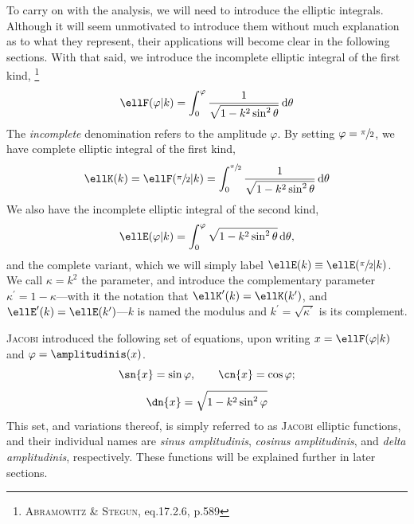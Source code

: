 To carry on with the analysis, we will need to introduce the elliptic integrals.
Although it will seem unmotivated to introduce them without much explanation as to what they represent, their applications will become clear in the following sections.
With that said, we introduce the incomplete elliptic integral of the first kind,%
\footnote{\cite{abramowitz1965handbook} \textsc{Abramowitz} \& \textsc{Stegun}, eq.17.2.6, p.589}
\begin{equation}\label{eq:incomplete_elliptic_integral_first}
  \ellF(\varphi \vert k) = \int_{0}^{\varphi} \frac{1}{\sqrt{1 - k^2 \sin^2{\theta}}}\,\dee\theta
\end{equation}
The \emph{incomplete} denomination refers to the amplitude $\varphi$.
By setting $\varphi = \sfrac{\pi}{2}$, we have complete elliptic integral of the first kind,
\begin{equation}\label{eq:complete_elliptic_integral_first}
  \ellK(k) = \ellF(\sfrac{\pi}{2} \vert k) = \int_{0}^{\sfrac{\pi}{2}} \frac{1}{\sqrt{1 - k^2 \sin^2{\theta}}} \,\dee\theta
\end{equation}
We also have the incomplete elliptic integral of the second kind,
\begin{equation}\label{eq:incomplete_elliptic_integral_second}
  \ellE(\varphi \vert k) = \int_{0}^{\varphi} \sqrt{1 - k^2 \sin^2{\theta}}\,\dee\theta,
\end{equation}
and the complete variant, which we will simply label $\ellE(k) \equiv \ellE(\sfrac{\pi}{2} \vert k)$.
We call $\kappa = k^2$ the parameter, and introduce the complementary parameter ${\kappa}^{\prime} = 1 - \kappa$---with it the notation that $\ellK^{\prime}(k) = \ellK(k^{\prime})$, and $\ellE^{\prime}(k) = \ellE(k^{\prime})$---$k$ is named the modulus and $k^{\prime} = \sqrt{\kappa^{\prime}}$ is its complement.

\textsc{Jacobi} introduced the following set of equations, upon writing $x = \ellF(\varphi \vert k)$ and $\varphi = \amplitudinis(x)$.
\begin{equation}\label{eq:jacobi_sn_cn}
  \sn{x} = \sin{\varphi}, \qquad \cn{x} = \cos{\varphi};
\end{equation}
\begin{equation}\label{eq:jacobi_dn}
  \dn{x} = \sqrt{1 - k^2\sin^2{\varphi}}
\end{equation}
This set, and variations thereof, is simply referred to as \textsc{Jacobi} elliptic functions, and their individual names are \emph{sinus amplitudinis}, \emph{cosinus amplitudinis}, and \emph{delta amplitudinis}, respectively.
These functions will be explained further in later sections.
